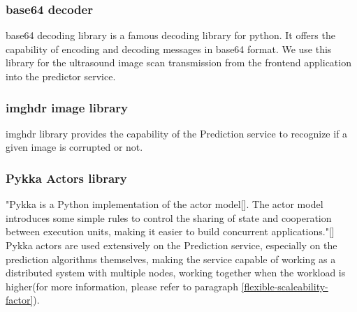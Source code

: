 			\subsubsection{base64 decoder}
				base64 decoding library is a famous decoding library for python. It offers the capability of encoding and decoding 
				messages in base64 format. We use this library for the ultrasound image scan transmission from the frontend application 
				into the predictor service.
			\subsubsection{imghdr image library}
				imghdr library provides the capability of the Prediction service to recognize if a given image is corrupted or not.
			\subsubsection{Pykka Actors library}
				"Pykka is a Python implementation of the actor model[\cite{hewitt2015actor}]. The actor model introduces some 
				simple rules to control the sharing of state and cooperation between execution units, making it easier to build 
				concurrent applications."[\cite{magnus_2010}] Pykka actors are used extensively on the Prediction service, 
				especially on the prediction algorithms themselves, making the service capable of working as a distributed 
				system with multiple nodes, working together when the workload is higher(for more information, please refer to 
				paragraph \ref{flexible-scaleability-factor}).
				
